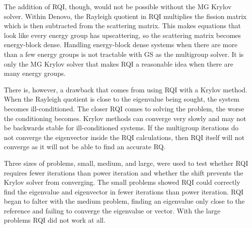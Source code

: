 The addition of RQI, though, would not be possible without the MG Krylov solver. Within Denovo, the Rayleigh quotient in RQI multiplies the fission matrix which is then subtracted from the scattering matrix. This makes equations that look like every energy group has upscattering, so the scattering matrix becomes energy-block dense. Handling energy-block dense systems when there are more than a few energy groups is not tractable with GS as the multigroup solver. It is only the MG Krylov solver that makes RQI a reasonable idea when there are many energy groups.


There is, however, a drawback that comes from using RQI with a Krylov method. When the Rayleigh quotient is close to the eigenvalue being sought, the system becomes ill-conditioned. The closer RQI comes to solving the problem, the worse the conditioning becomes. Krylov methods can converge very slowly and may not be backwards stable for ill-conditioned systems. If the multigroup iterations do not converge the eigenvector inside the RQI calculations, then RQI itself will not converge as it will not be able to find an accurate RQ.

Three sizes of problems, small, medium, and large, were used to test whether RQI requires fewer iterations than power iteration and whether the shift prevents the Krylov solver from converging. The small problems showed RQI could correctly find the eigenvalue and eigenvector in fewer iterations than power iteration. RQI began to falter with the medium problem, finding an eigenvalue only close to the reference and failing to converge the eigenvalue or vector. With the large problems RQI did not work at all.



